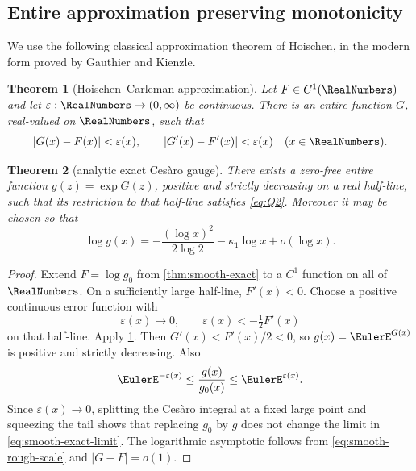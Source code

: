 \documentclass[11pt,oneside]{article}
\newtheorem{theorem}{Theorem}[section]
\theoremstyle{definition}
\theoremstyle{remark}
\begin{document}
\subsection{Entire approximation preserving monotonicity}

We use the following classical approximation theorem of Hoischen, in the
modern form proved by Gauthier and Kienzle.

\begin{theorem}[Hoischen--Carleman approximation]
\label{thm:Hoischen}
Let \(F\in C^1(\RealNumbers)\) and let \(\varepsilon:\RealNumbers\to(0,\infty)\) be continuous.
There is an entire function \(G\), real-valued on \(\RealNumbers\), such that
\begin{equation}
 |G(x)-F(x)|<\varepsilon(x),
 \qquad
 |G'(x)-F'(x)|<\varepsilon(x)
 \quad(x\in\RealNumbers).
 \label{eq:Hoischen}
\end{equation}
\end{theorem}

\begin{theorem}[analytic exact Ces\`aro gauge]
\label{thm:analytic-exact}
There exists a zero-free entire function \(g(z)=\exp G(z)\), positive and
strictly decreasing on a real half-line, such that its restriction to that
half-line satisfies \eqref{eq:Q2}.  Moreover it may be chosen so that
\begin{equation}
 \log g(x)
 =-\frac{(\log x)^2}{2\log2}-\kappa_1\log x+o(\log x).
 \label{eq:analytic-rough-scale}
\end{equation}
\end{theorem}

\begin{proof}
Extend \(F=\log g_0\) from \cref{thm:smooth-exact} to a \(C^1\) function on
all of \(\RealNumbers\).  On a sufficiently large half-line, \(F'(x)<0\).  Choose a
positive continuous error function with
\[
 \varepsilon(x)\longrightarrow0,
 \qquad
 \varepsilon(x)<-\tfrac12F'(x)
\]
on that half-line.  Apply \cref{thm:Hoischen}.  Then
\(G'(x)<F'(x)/2<0\), so \(g(x)=\EulerE^{G(x)}\) is positive and strictly
decreasing.  Also
\[
 \EulerE^{-\varepsilon(x)}
 \le\frac{g(x)}{g_0(x)}\le\EulerE^{\varepsilon(x)}.
\]
Since \(\varepsilon(x)\to0\), splitting the Ces\`aro integral at a fixed
large point and squeezing the tail shows that replacing \(g_0\) by \(g\)
does not change the limit in \eqref{eq:smooth-exact-limit}.  The logarithmic
asymptotic follows from \eqref{eq:smooth-rough-scale} and
\(|G-F|=o(1)\).
\end{proof}
\end{document}
